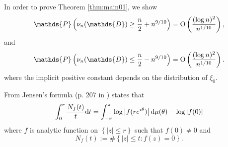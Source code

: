 \documentclass[12pt]{amsart}
\theoremstyle{plain}
\numberwithin{equation}{section}
\renewcommand{\Pr}{\mathbb{P}}
\newcommand{\<}{\langle}
\renewcommand{\>}{\rangle}
\newcommand{\PP}[1]{\left(#1\right)}
\newcommand{\LL}[1]{\left\{#1\right\}}
\newcommand{\dd}{\textnormal{d}}
\newcommand{\abs}[1]{\left|#1\right|}
\renewcommand{\Pr}[1]{\mathds{P}\left(#1\right)}
\begin{document}

In order to prove Theorem \ref{thm:main01}, we show 
\begin{equation}\label{eqn:upperbound}
\Pr{\nu_n(\mathds{D}) \geq \frac{n}{2}+n^{9/10}} = \textnormal{O}\PP{ \frac{(\log n)^2}{n^{1/10}} },
\end{equation}
and 
\begin{equation}\label{eqn:lowerbound}
\Pr{\nu_n(\mathds{D}) \leq \frac{n}{2}-n^{9/10}}= \textnormal{O}\PP{ \frac{(\log n)^2}{n^{1/10}}}.
\end{equation}
where the implicit positive constant depends on the distribution of $\xi_0$.

From Jensen's formula (p. 207 in \cite{ahlfors1979complex}) states that
\begin{equation}\label{eqn:jensen}
\int_{0}^r \frac{N_f(t)}{t} \dd t = \int_{-\pi}^{\pi} \log\abs{f(re^{i\theta})} \dd\mu(\theta) - \log\abs{f(0)}
\end{equation}
where $f$ is analytic function on $\LL{\abs{z}\leq r}$ such that $f(0)\neq 0$ and 
\[
N_f(t) := \#\LL{\abs{z}\leq t : f(z)=0}.
\]
\end{document}
